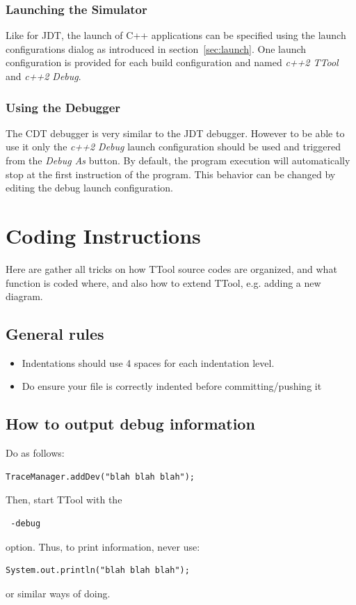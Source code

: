 \documentclass[12pt]{article}
\begin{document}
\subsubsection{Launching the Simulator}

Like for JDT, the launch of C++ applications can be specified using the launch
configurations dialog as introduced in section~\ref{sec:launch}. One launch
configuration is provided for each build configuration and named
\textit{c++2 TTool} and \textit{c++2 Debug}.

\subsubsection{Using the Debugger}

The CDT debugger is very similar to the JDT debugger. However to be able to use
it only the \textit{c++2 Debug} launch configuration should be used and
triggered from the \textit{Debug As} button. By default, the program execution
will automatically stop at the first instruction of the program. This behavior
can be changed by editing the debug launch configuration.


\section{Coding Instructions}
Here are gather all tricks on how TTool source codes are organized, and what function is coded where, and also how to extend TTool, e.g. adding a new diagram.

\subsection{General rules}

\begin{itemize}
\item Indentations should use 4 spaces for each indentation level.
\item Do ensure your file is correctly indented before committing/pushing it
\end{itemize}


\subsection{How to output debug information}
Do as follows:
\begin{lstlisting}
TraceManager.addDev("blah blah blah");
\end{lstlisting}
Then, start TTool with the 
\begin{verbatim}
 -debug
\end{verbatim}
option.
Thus, to print information, never use:
\begin{lstlisting}
System.out.println("blah blah blah");
\end{lstlisting}
or similar ways of doing.
\end{document}
